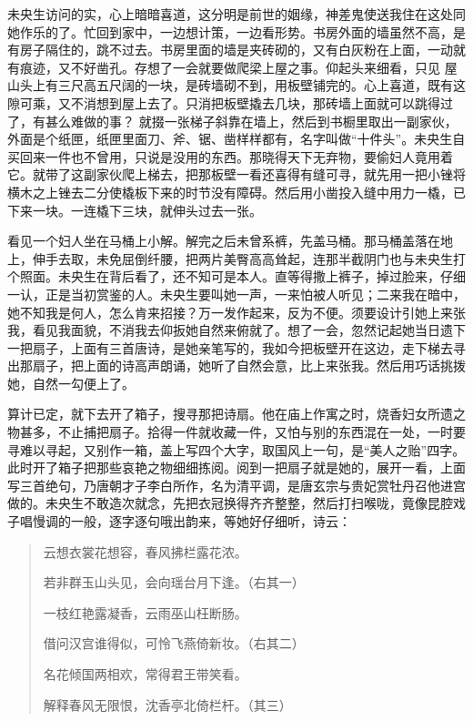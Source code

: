 \documentclass[a4paper,12pt,UTF8,twoside]{ctexbook}
\begin{document}
未央生访问的实，心上暗暗喜道，这分明是前世的姻缘，神差鬼使送我住在这处同她作乐的了。忙回到家中，一边想计策，一边看形势。书房外面的墙虽然不高，是有房子隔住的，跳不过去。书房里面的墙是夹砖砌的，又有白灰粉在上面，一动就有痕迹，又不好凿孔。存想了一会就要做爬梁上屋之事。仰起头来细看，只见 屋山头上有三尺高五尺阔的一块，是砖墙砌不到，用板壁铺完的。心上喜道，既有这隙可乘，又不消想到屋上去了。只消把板壁撬去几块，那砖墙上面就可以跳得过了，有甚么难做的事？ 就掇一张梯子斜靠在墙上，然后到书橱里取出一副家伙，外面是个纸匣，纸匣里面刀、斧、锯、凿样样都有，名字叫做“十件头”。未央生自买回来一件也不曾用，只说是没用的东西。那晓得天下无弃物，要偷妇人竟用着它。就带了这副家伙爬上梯去，把那板壁一看还喜得有缝可寻，就先用一把小锉将横木之上锉去二分使橇板下来的时节没有障碍。然后用小凿投入缝中用力一橇，已下来一块。一连橇下三块，就伸头过去一张。

看见一个妇人坐在马桶上小解。解完之后未曾系裤，先盖马桶。那马桶盖落在地上，伸手去取，未免屈倒纤腰，把两片美臀高高耸起，连那半截阴门也与未央生打个照面。未央生在背后看了，还不知可是本人。直等得撒上裤子，掉过脸来，仔细一认，正是当初赏鉴的人。未央生要叫她一声，一来怕被人听见；二来我在暗中，她不知我是何人，怎么肯来招接？万一发作起来，反为不便。须要设计引她上来张我，看见我面貌，不消我去仰扳她自然来俯就了。想了一会，忽然记起她当日遗下一把扇子，上面有三首唐诗，是她亲笔写的，我如今把板壁开在这边，走下梯去寻出那扇子，把上面的诗高声朗诵，她听了自然会意，比上来张我。然后用巧话挑拨她，自然一勾便上了。

算计已定，就下去开了箱子，搜寻那把诗扇。他在庙上作寓之时，烧香妇女所遗之物甚多，不止捕把扇子。拾得一件就收藏一件，又怕与别的东西混在一处，一时要寻难以寻起，又别作一箱，盖上写四个大字，取国风上一句，是“美人之贻”四字。此时开了箱子把那些哀艳之物细细拣阅。阅到一把扇子就是她的，展开一看，上面写三首绝句，乃唐朝才子李白所作，名为清平调，是唐玄宗与贵妃赏牡丹召他进宫做的。未央生不敢造次就念，先把衣冠换得齐齐整整，然后打扫喉咙，竟像昆腔戏子唱慢调的一般，逐字逐句哦出韵来，等她好仔细听，诗云：

\begin{quotation}
云想衣裳花想容，春风拂栏露花浓。

若非群玉山头见，会向瑶台月下逢。（右其一）

一枝红艳露凝香，云雨巫山枉断肠。

借问汉宫谁得似，可怜飞燕倚新妆。（右其二）

名花倾国两相欢，常得君王带笑看。

解释春风无限恨，沈香亭北倚栏杆。（其三）
\end{quotation}
\end{document}
